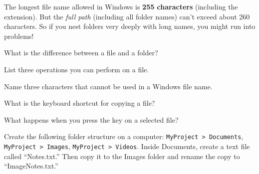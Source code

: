 \begin{funfact}
The longest file name allowed in Windows is \textbf{255 characters} (including the extension). But the \emph{full path} (including all folder names) can't exceed about 260 characters. So if you nest folders very deeply with long names, you might run into problems!
\end{funfact}

\begin{reviewqs}
  \item What is the difference between a file and a folder?
  \item List three operations you can perform on a file.
  \item Name three characters that cannot be used in a Windows file name.
  \item What is the keyboard shortcut for copying a file?
  \item What happens when you press the  key on a selected file?
\end{reviewqs}

\begin{challenge}
Create the following folder structure on a computer: \texttt{MyProject > Documents}, \texttt{MyProject > Images}, \texttt{MyProject > Videos}. Inside Documents, create a text file called ``Notes.txt.'' Then copy it to the Images folder and rename the copy to ``ImageNotes.txt.''
\end{challenge}
